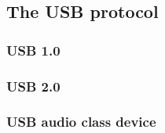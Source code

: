\subsection{The USB protocol}
\subsubsection{USB 1.0}
\subsubsection{USB 2.0}
\subsubsection{USB audio class device}

